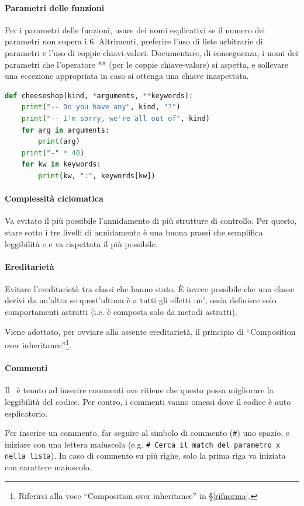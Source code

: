 		\paragraph{Parametri delle funzioni}
		Per i parametri delle funzioni, usare dei nomi esplicativi se il numero dei parametri non supera i 6. Altrimenti, preferire l'uso di liste
		arbitrarie di parametri e l'uso di coppie chiavi-valori. Documentare, di conseguenza,
		i nomi dei parametri che l'operatore ** (per le coppie chiave-valore) si aspetta, e sollevare una eccezione appropriata in caso si ottenga una chiave
		inaspettata.
\begin{lstlisting}[language=Python]
def cheeseshop(kind, *arguments, **keywords):
    print("-- Do you have any", kind, "?")
    print("-- I'm sorry, we're all out of", kind)
    for arg in arguments:
        print(arg)
    print("-" * 40)
    for kw in keywords:
        print(kw, ":", keywords[kw])
\end{lstlisting}

        \paragraph{Complessità ciclomatica}
		Va evitato il più possibile l'annidamento di più strutture di controllo. Per questo, stare sotto i tre livelli di annidamento è una buona
		prassi che semplifica leggibilità e  e va rispettata il più possibile.


		\paragraph{Ereditarietà}
		Evitare l'ereditarietà tra classi che hanno stato. È invece possibile che una classe derivi da un'altra se quest'ultima è a tutti gli
		effetti un', ossia definisce solo comportamenti astratti (i.e. è composta solo da metodi astratti).\par
		Viene adottato, per ovviare alla assente ereditarietà, il principio di ``Composition over inheritance''\footnote{Riferirsi alla voce %
		``Composition over inheritance'' in \S\ref{rifnorma}.}.


        \paragraph{Commenti}
		Il \Progr\ è tenuto ad inserire commenti ove ritiene che questo possa migliorare la leggibilità del codice. Per contro, i commenti vanno
		omessi dove il codice è auto esplicatorio.\par
		Per inserire un commento, far seguire al simbolo di commento (\texttt{\#}) uno spazio, e iniziare con una lettera maiuscola (e.g.
		\texttt{\#\ Cerca il match del parametro x nella lista}). In caso di commento su più righe, solo la prima riga va iniziata con carattere
		maiuscolo.

